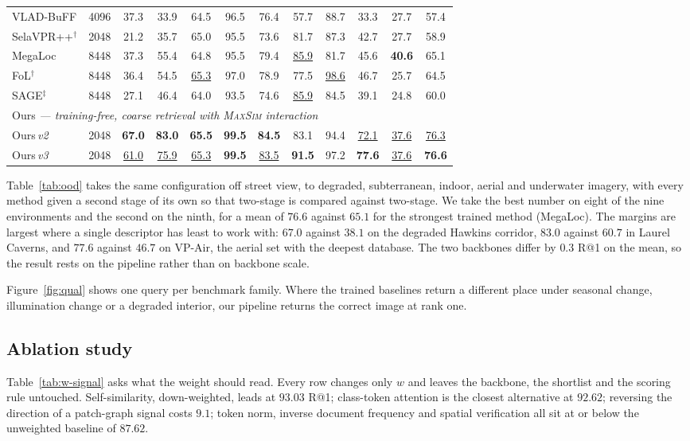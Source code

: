 \begin{table}[t]
{\begin{tabular}{llccccccccc|c}
VLAD-BuFF & 4096 & 37.3 & 33.9 & 64.5 & 96.5 & 76.4 & 57.7 & 88.7 & 33.3 & 27.7 & 57.4 \\
SelaVPR++$^{\dagger}$ & 2048 & 21.2 & 35.7 & 65.0 & 95.5 & 73.6 & 81.7 & 87.3 & 42.7 & 27.7 & 58.9 \\
MegaLoc & 8448 & 37.3 & 55.4 & 64.8 & 95.5 & 79.4 & \underline{85.9} & 81.7 & 45.6 & \textbf{40.6} & 65.1 \\
FoL$^{\dagger}$ & 8448 & 36.4 & 54.5 & \underline{65.3} & 97.0 & 78.9 & 77.5 & \underline{98.6} & 46.7 & 25.7 & 64.5 \\
SAGE$^\ddag$ & 8448 & 27.1 & 46.4 & 64.0 & 93.5 & 74.6 & \underline{85.9} & 84.5 & 39.1 & 24.8 & 60.0 \\
\midrule
\multicolumn{12}{l}{Ours \emph{--- training-free, coarse retrieval with \textsc{MaxSim} interaction}} \\
Ours\,\emph{v2} & 2048 & \textbf{67.0} & \textbf{83.0} & \textbf{65.5} & \textbf{99.5} & \textbf{84.5} & 83.1 & 94.4 & \underline{72.1} & \underline{37.6} & \underline{76.3} \\
Ours\,\emph{v3} & 2048 & \underline{61.0} & \underline{75.9} & \underline{65.3} & \textbf{99.5} & \underline{83.5} & \textbf{91.5} & 97.2 & \textbf{77.6} & \underline{37.6} & \textbf{76.6} \\
\bottomrule
\end{tabular}%
}
\end{table}

Table~\ref{tab:ood} takes the same configuration off street view, to degraded, subterranean, indoor, aerial and underwater imagery, with every method given a second stage of its own so that two-stage is compared against two-stage. We take the best number on eight of the nine environments and the second on the ninth, for a mean of $76.6$ against $65.1$ for the strongest trained method (MegaLoc). The margins are largest where a single descriptor has least to work with: $67.0$ against $38.1$ on the degraded Hawkins corridor, $83.0$ against $60.7$ in Laurel Caverns, and $77.6$ against $46.7$ on VP-Air, the aerial set with the deepest database. The two backbones differ by $0.3$ R@1 on the mean, so the result rests on the pipeline rather than on backbone scale.

Figure~\ref{fig:qual} shows one query per benchmark family. Where the trained baselines return a different place under seasonal change, illumination change or a degraded interior, our pipeline returns the correct image at rank one.


\subsection{Ablation study}
\label{sec:swap}
Table~\ref{tab:w-signal} asks what the weight should read. Every row changes only $w$ and leaves the backbone, the shortlist and the scoring rule untouched. Self-similarity, down-weighted, leads at $93.03$ R@1; class-token attention is the closest alternative at $92.62$; reversing the direction of a patch-graph signal costs $9.1$; token norm, inverse document frequency and spatial verification all sit at or below the unweighted baseline of $87.62$.

